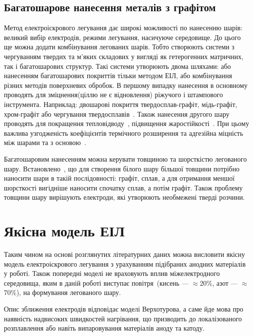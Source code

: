 \documentclass[a4paper,fontsize=14bp,ukrainian]{extreport}
\begin{document}
\subsection{Багатошарове нанесення металів з графітом}
\label{subsec:multiplyeil}


Метод електроіскрового легування дає широкі можливості по нанесенню шарів: великий вибір електродів, режими легування, насичуюче середовище. До цього ще можна додати комбінування легованих шарів. Тобто створюють системи з чергуванням твердих та м'яких складових у вигляді як гетерогенних матричних, так і багатошарових структур. Такі системи утворюють двома шляхами: або нанесенням багатошарових покриттів тільки методом ЕІЛ, або комбінування різних методів поверхневих обробок. В першому випадку нанесення в основному проводять для зміцнення(ціллю не є відновлення) ріжучого і штампового інструмента. Наприклад: двошарові покриття твердосплав-графіт, мідь-графіт, хром-графіт або чергування твердосплавів~\cite{yarkov2004}. Також нанесення другого шару проводять для покращення тепловідводу~\cite{yarkov2004}, підвищення жаростійкості~\cite{kadenacy1989}. При цьому важлива узгодженість коефіцієнтів термічного розширення та адгезійна міцність між шарами та з основою~\cite{podchernyaeva2012}.

Багатошаровим нанесенням можна керувати товщиною та шорсткістю легованого шару. Встановлено~\cite{verkhoturova}, що для створення білого шару більшої товщини потрібно наносити шари в такій послідовності: графіт, сплав, а для отримання меншої шорсткості  вигідніше наносити спочатку сплав, а потім графіт. Також проблему товщини шару вирішують електроди, які утворюють необмежені тверді розчини.

\section{Якісна модель ЕІЛ}

Таким чином на основі розглянутих літературних даних можна висловити якісну модель електроіскрового легування з урахуванням підібраних анодних матеріалів у роботі. Також попередні моделі не враховують вплив міжелектродного середовища, яким в даній роботі виступає повітря~(кисень --- $\approx$20\%, азот --- $\approx$70\%), на формування легованого шару.

Опис зближення електродів відповідає моделі Верхотурова, а саме йде мова про наявність надвисоких швидкостей нагрівання, що призводить до локалізованого розплавлення або навіть випаровування матеріалів аноду та катоду.
\end{document}
